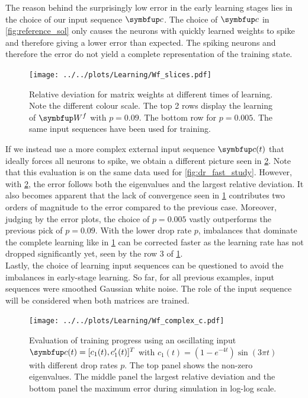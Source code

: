 The reason behind the surprisingly low error in the early learning stages lies in the choice of our input sequence $\bmu{c}$. The choice of $\bmu{c}$ in \cref{fig:reference_sol} only causes the neurons with quickly learned weights to spike and therefore giving a lower error than expected. The spiking neurons and therefore the error do not yield a complete representation of the training state.\\
\begin{figure}
	\centering
	\texttt{[image: ../../plots/Learning/Wf\_slices.pdf]}
	\caption{Relative deviation for matrix weights at different times of learning. Note the different colour scale. The top 2 rows display the learning of $\bmu{W}^f$ with $p = 0.09$. The bottom row for $p=0.005$. The same input sequences have been used for training.}
	\label{fig:Wf_slices}
\end{figure}
If we instead use a more complex external input sequence $\bmu{c}(t)$ that ideally forces all neurons to spike, we obtain a different picture seen in \cref{fig:complex_seq}. Note that this evaluation is on the same data used for \cref{fig:dr_fast_study}. However, with \cref{fig:complex_seq}, the error follows both the eigenvalues and the largest relative deviation. It also becomes apparent that the lack of convergence seen in \cref{fig:Wf_slices} contributes two orders of magnitude to the error compared to the previous case. Moreover, judging by the error plots, the choice of $p = 0.005$ vastly outperforms the previous pick of $p= 0.09$. With the lower drop rate $p$, imbalances that dominate the complete learning like in \cref{fig:Wf_slices} can be corrected faster as the learning rate has not dropped significantly yet, seen by the row 3 of \cref{fig:Wf_slices}.\\
Lastly, the choice of learning input sequences can be questioned to avoid the imbalances in early-stage learning. So far, for all previous examples, input sequences were smoothed Gaussian white noise. The role of the input sequence will be considered when both matrices are trained.\\
\begin{figure}
	\centering
	\texttt{[image: ../../plots/Learning/Wf\_complex\_c.pdf]}
	\caption{Evaluation of training progress using an oscillating input $\bmu{c}(t) = [c_1(t),c_1'(t)]^T$ with $c_1(t) = (1-e^{-4t})\sin(3\pi t)$ with different drop rates $p$. The top panel shows the non-zero eigenvalues. The middle panel the largest relative deviation and the bottom panel the maximum error during simulation in log-log scale.}
	\label{fig:complex_seq}
\end{figure}

